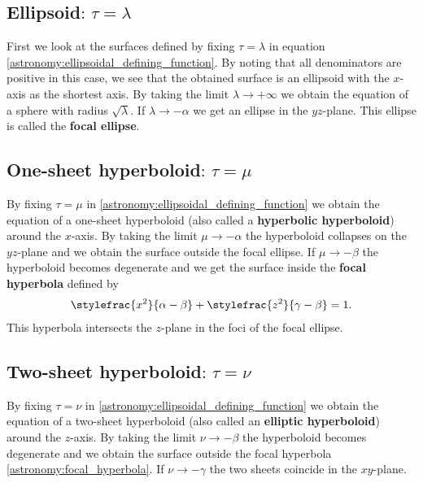 \subsection{Ellipsoid\texorpdfstring{$\text{: }\tau = \lambda$}{}}

    First we look at the surfaces defined by fixing $\tau = \lambda$ in equation \ref{astronomy:ellipsoidal_defining_function}. By noting that all denominators are positive in this case, we see that the obtained surface is an ellipsoid with the $x$-axis as the shortest axis. By taking the limit $\lambda\rightarrow+\infty$ we obtain the equation of a sphere with radius $\sqrt{\lambda}$. If $\lambda\rightarrow-\alpha$ we get an ellipse in the $yz$-plane. This ellipse is called the \textbf{focal ellipse}.

\subsection{One-sheet hyperboloid\texorpdfstring{$\text{: }\tau = \mu$}{}}

    By fixing $\tau=\mu$ in \ref{astronomy:ellipsoidal_defining_function} we obtain the equation of a one-sheet hyperboloid (also called a \textbf{hyperbolic hyperboloid}) around the $x$-axis. By taking the limit $\mu\rightarrow-\alpha$ the hyperboloid collapses on the $yz$-plane and we obtain the surface outside the focal ellipse. If $\mu\rightarrow-\beta$ the hyperboloid becomes degenerate and we get the surface inside the \textbf{focal hyperbola} defined by
    \begin{gather}
        \label{astronomy:focal_hyperbola}
        \stylefrac{x^2}{\alpha-\beta} + \stylefrac{z^2}{\gamma-\beta} = 1.
    \end{gather}
    This hyperbola intersects the $z$-plane in the foci of the focal ellipse.

\subsection{Two-sheet hyperboloid\texorpdfstring{$\text{: }\tau = \nu$}{}}

    By fixing $\tau=\nu$ in \ref{astronomy:ellipsoidal_defining_function} we obtain the equation of a two-sheet hyperboloid (also called an \textbf{elliptic hyperboloid}) around the $z$-axis. By taking the limit $\nu\rightarrow-\beta$ the hyperboloid becomes degenerate and we obtain the surface outside the focal hyperbola \ref{astronomy:focal_hyperbola}. If $\nu\rightarrow-\gamma$ the two sheets coincide in the $xy$-plane.

